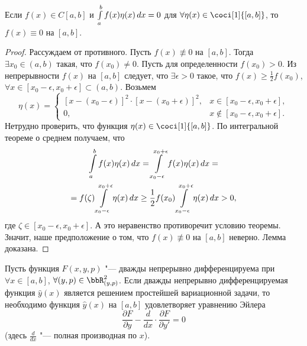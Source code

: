 \begin{lemm} \label{ch29.2lemm1}
Если $f(x)\in C[a,b]$ и $\int_a^b\limits f(x)\eta(x)\,dx=0$ для $\forall\eta(x)\in \coci[1]{[a,b]}$, то $f(x)\equiv 0$ на $[a,b]$.
\end{lemm}
\begin{proof}
Рассуждаем от противного. Пусть $f(x) \not\equiv  0$ на $[a,b]$. Тогда $\exists x_0\in(a,b)$ такая, что $f(x_0)\neq 0$. Пусть для определенности $f(x_0)>0$. Из непрерывности $f(x)$ на $[a,b]$ следует, что $\exists\epsilon>0$ такое, что $f(x)\geq\frac{1}{2}f(x_0)$, $\forall x\in [x_0-\epsilon,x_0+\epsilon]\subset (a,b).$ Возьмем
$$
\eta(x)=\begin{cases} 
[x-(x_0-\epsilon)]^2\cdot [x-(x_0+\epsilon)]^2, &x\in[x_0-\epsilon,x_0+\epsilon],\\
0, &x\notin[x_0-\epsilon,x_0+\epsilon].
\end{cases}
$$
Нетрудно проверить, что функция $\eta(x)\in \coci[1]{[a,b]}$. По интегральной теореме о среднем получаем, что
\begin{multline*}
\int_a^b\limits f(x)\eta(x)\,dx=\int\limits_{x_0-\epsilon}^{x_0+\epsilon} f(x)\eta(x)\,dx =\\= f(\zeta)\int\limits_{x_0-\epsilon}^{x_0+\epsilon}\eta(x)\,dx \geq \frac{1}{2} f(x_0)\int\limits_{x_0-\epsilon}^{x_0+\epsilon}  \eta (x)\,dx>0,
\end{multline*}
где $\zeta\in[x_0-\epsilon,x_0+\epsilon]$. А это неравенство противоречит условию теоремы. Значит, наше предположение о том, что $f(x)\not\equiv  0$ на $[a,b]$ неверно. Лемма доказана.
\end{proof}


\begin{thm}\label{ch29thm2}
Пусть функция $F(x,y,p)$ "--- дважды непрерывно дифференцируема при $\forall x\in[a,b]$, $\forall(y,p)\in \bbR^2_{(y,p)}$. Если дважды непрерывно дифференцируемая функция $\hat{y}(x)$ является решением простейшей вариационной задачи, то необходимо функция $\hat{y}(x)$ на $[a,b]$ удовлетворяет уравнению Эйлера
\begin{equation} \label{ch29eq5}
\frac{\partial F}{\partial y}-\frac{d}{dx}\cdot\frac{\partial F}{\partial y'}=0
\end{equation}
\textup{(}здесь $\frac{d}{dx}$ "--- полная производная по $x$\textup{)}.
\end{thm}

